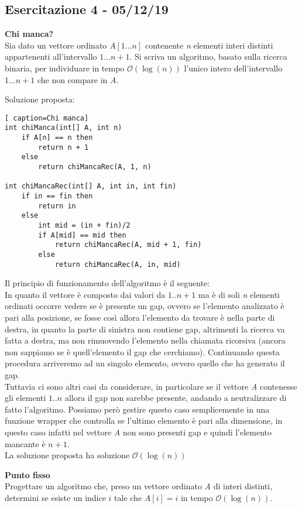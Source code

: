 \documentclass[../cheatSheetAlgoritmi.tex]{subfiles}
\begin{document}
\subsection{Esercitazione 4 - 05/12/19}
\textbf{Chi manca?} \\
Sia dato un vettore ordinato $A[1...n]$ contenente \textit{n} elementi interi distinti appartenenti all’intervallo $1...n+1$. Si scriva un algoritmo, basato sulla ricerca binaria, per individuare in tempo $\mathcal{O}(\log(n))$ l’unico intero dell’intervallo $1...n+1$ che non compare in \textit{A}.

\bigskip
Soluzione proposta:
\begin{lstlisting}[ caption=Chi manca]
int chiManca(int[] A, int n)
	if A[n] == n then
		return n + 1
	else	
		return chiMancaRec(A, 1, n)

int chiMancaRec(int[] A, int in, int fin)
	if in == fin then 
  		return in
  	else
    	int mid = (in + fin)/2
    	if A[mid] == mid then 
      		return chiMancaRec(A, mid + 1, fin)
    	else
      		return chiMancaRec(A, in, mid)
\end{lstlisting}
Il principio di funzionamento dell'algoritmo è il seguente: \\
In quanto il vettore è composto dai valori da $1..n+1$ ma è di soli \textit{n} elementi ordinati occorre vedere se è presente un gap, ovvero se l'elemento analizzato è pari alla posizione, se fosse così allora l'elemento da trovare è nella parte di destra, in quanto la parte di sinistra non contiene gap, altrimenti la ricerca va fatta a destra, ma non rimuovendo l'elemento nella chiamata ricorsiva (ancora non sappiamo se è quell'elemento il gap che cerchiamo). Continuando questa procedura arriveremo ad un singolo elemento, ovvero quello che ha generato il gap.\\
Tuttavia ci sono altri casi da considerare, in particolare se il vettore \textit{A} contenesse gli elementi $1..n$ allora il gap non sarebbe presente, andando a neutralizzare di fatto l'algoritmo. Possiamo però gestire questo caso semplicemente in una funzione wrapper che controlla se l'ultimo elemento è pari alla dimensione, in questo caso infatti nel vettore \textit{A} non sono presenti gap e quindi l'elemento mancante è $n + 1$. \\
La soluzione proposta ha soluzione $\mathcal{O}(\log(n))$

\bigskip
\textbf{Punto fisso} \\
Progettare un algoritmo che, preso un vettore ordinato \textit{A} di interi distinti, determini se esiste un indice $i$ tale che $A[i] = i$ in tempo $\mathcal{O}(\log(n))$.
\end{document}
